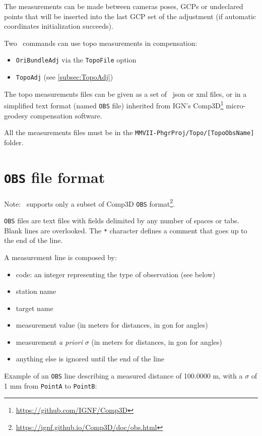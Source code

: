 The measurements can be made between cameras poses, GCPs or undeclared points that will be inserted into the last GCP set of the adjustment
(if automatic coordinates initialization succeeds).

Two \CdPPP\ commands can use topo measurements in compensation:
\begin{itemize}
    \item \texttt{OriBundleAdj} via the \texttt{TopoFile} option
    \item \texttt{TopoAdj} (see \ref{subsec:TopoAdj})
\end{itemize}

The topo measurements files can be given as a set of \CdPPP\ json or xml files, or in a simplified text format (named \texttt{OBS} file) inherited from IGN's
Comp3D\footnote{\url{https://github.com/IGNF/Comp3D}} micro-geodesy compensation software.

All the measurements files must be in the \texttt{MMVII-PhgrProj/Topo/[TopoObsName]} folder.

\section{\texttt{OBS} file format}
\label{sec:compObsFormat}

Note: \CdPPP\ supports only a subset of Comp3D \texttt{OBS} format\footnote{\url{https://ignf.github.io/Comp3D/doc/obs.html}}.

\texttt{OBS} files are text files with fields delimited by any number of spaces or tabs. Blank lines are overlooked.
The \texttt{*} character defines a comment that goes up to the end of the line.

A measurement line is composed by:

\begin{itemize}
    \item code: an integer representing the type of observation (see below)
    \item station name
    \item target name
    \item measurement value (in meters for distances, in gon for angles)
    \item measurement \textit{a priori} $\sigma$ (in meters for distances, in gon for angles)
    \item anything else is ignored until the end of the line
\end{itemize}

Example of an \texttt{OBS} line describing a measured distance of 100.0000 m, with a $\sigma$ of 1 mm from \texttt{PointA} to \texttt{PointB}:

